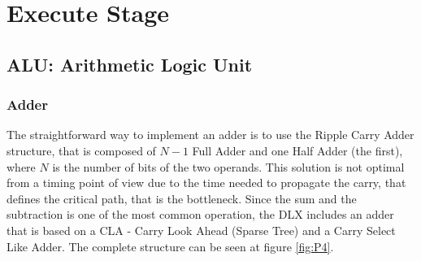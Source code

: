 \chapter{Execute Stage}

\section{ALU: Arithmetic Logic Unit}
\subsection{Adder}
The straightforward way to implement an adder is to use the Ripple Carry Adder structure, that is composed of $N-1$ Full Adder and one Half Adder (the first), where $N$ is the number of bits of the two operands. This solution is not optimal from a timing point of view due to the time needed to propagate the carry, that defines the critical path, that is the bottleneck. \newline\newline
Since the sum and the subtraction is one of the most common operation, the DLX includes an adder that is based on a CLA - Carry Look Ahead (Sparse Tree) and a Carry Select Like Adder. The complete structure can be seen at figure \ref{fig:P4}.


